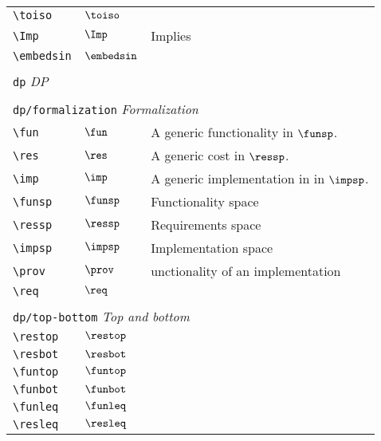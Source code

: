 \begin{longtable}{lll}
 {\color[rgb]{0.5,0.5,0.5}\texttt{\textbackslash toiso}} & $\toiso$ & \\ 
 {\color[rgb]{0.5,0.5,0.5}\texttt{\textbackslash Imp}} & $\Imp$ &  Implies\\ 
 {\color[rgb]{0.5,0.5,0.5}\texttt{\textbackslash embedsin}} & $\embedsin$ & \\ 
  &  & \\ 
 \multicolumn{3}{l}{{\color[rgb]{0.5,0.5,0.5}\texttt{dp}} \emph{DP}}\\ 
 \hline
\hline
 &  & \\ 
 \multicolumn{3}{l}{{\color[rgb]{0.5,0.5,0.5}\texttt{dp/formalization}} \emph{Formalization}}\\ 
 \hline
{\color[rgb]{0.5,0.5,0.5}\texttt{\textbackslash fun}} & $\fun$ &  A generic functionality in $\funsp$.\\ 
 {\color[rgb]{0.5,0.5,0.5}\texttt{\textbackslash res}} & $\res$ &  A generic cost in $\ressp$.\\ 
 {\color[rgb]{0.5,0.5,0.5}\texttt{\textbackslash imp}} & $\imp$ &  A generic implementation in in $\impsp$.\\ 
 {\color[rgb]{0.5,0.5,0.5}\texttt{\textbackslash funsp}} & $\funsp$ &  Functionality space\\ 
 {\color[rgb]{0.5,0.5,0.5}\texttt{\textbackslash ressp}} & $\ressp$ &  Requirements space\\ 
 {\color[rgb]{0.5,0.5,0.5}\texttt{\textbackslash impsp}} & $\impsp$ &  Implementation space\\ 
 {\color[rgb]{0.5,0.5,0.5}\texttt{\textbackslash prov}} & $\prov$ &  unctionality of an implementation\\ 
 {\color[rgb]{0.5,0.5,0.5}\texttt{\textbackslash req}} & $\req$ & \\ 
  &  & \\ 
 \multicolumn{3}{l}{{\color[rgb]{0.5,0.5,0.5}\texttt{dp/top-bottom}} \emph{Top and bottom}}\\ 
 \hline
{\color[rgb]{0.5,0.5,0.5}\texttt{\textbackslash restop}} & $\restop$ & \\ 
 {\color[rgb]{0.5,0.5,0.5}\texttt{\textbackslash resbot}} & $\resbot$ & \\ 
 {\color[rgb]{0.5,0.5,0.5}\texttt{\textbackslash funtop}} & $\funtop$ & \\ 
 {\color[rgb]{0.5,0.5,0.5}\texttt{\textbackslash funbot}} & $\funbot$ & \\ 
 {\color[rgb]{0.5,0.5,0.5}\texttt{\textbackslash funleq}} & $\funleq$ & \\ 
 {\color[rgb]{0.5,0.5,0.5}\texttt{\textbackslash resleq}} & $\resleq$ & \\ 

\end{longtable}
